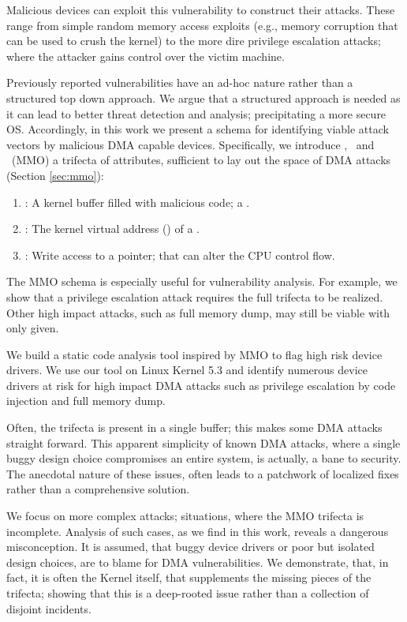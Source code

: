 Malicious devices can exploit this vulnerability to construct their attacks. These range from simple random memory access exploits (e.g., memory corruption that can be used to crush the kernel) to the more dire privilege escalation attacks; where the attacker gains control over the victim machine.

Previously reported vulnerabilities have an ad-hoc nature \cite{thunder,MMT16,Ben17b} rather than a structured top down approach. We argue that a structured approach is needed as it can lead to better threat detection and analysis; precipitating a more secure OS. Accordingly, in this work we present a schema for identifying viable attack vectors by malicious DMA capable devices. Specifically, we introduce \means,~\motivation{} and \oportunity~(MMO) a trifecta of attributes, sufficient to lay out the space of DMA attacks (Section \ref{sec:mmo}):
\begin{enumerate}
    \item \motivation: A kernel buffer filled with malicious code; a \mabaf.
    \item \means: The kernel virtual address (\kva) of a \mabaf.
    \item \oportunity: Write access to a pointer; that can alter the CPU control flow.
\end{enumerate} 

The MMO schema is especially useful for vulnerability analysis. For example, we show that a privilege escalation attack requires the full trifecta to be realized. Other high impact attacks, such as full memory dump, may still be viable with only \oportunity{} given. 

We build a static code analysis tool inspired by MMO to flag high risk device drivers. We use our tool on Linux Kernel 5.3 and identify numerous device drivers at risk for high impact DMA attacks such as privilege escalation by code injection and full memory dump. 

Often, the trifecta is present in a single buffer; this makes some DMA attacks straight forward. This apparent simplicity of known DMA attacks, where a single buggy design choice compromises an entire system, is actually, a bane to security. The anecdotal nature of these issues, often leads to a patchwork of localized fixes rather than a comprehensive solution. 

We focus on more complex attacks; situations, where the MMO trifecta is incomplete. Analysis of such cases, as we find in this work, reveals a dangerous misconception. It is assumed, that buggy device drivers or poor but isolated design choices, are to blame for DMA vulnerabilities. We demonstrate, that, in fact, it is often the Kernel itself, that supplements the missing pieces of the trifecta; showing that this is a deep-rooted issue rather than a collection of disjoint incidents.

